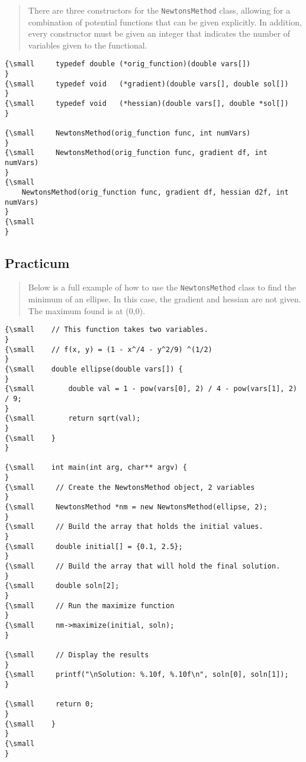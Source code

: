\begin{quotation}
There are three constructors for the \texttt{NewtonsMethod} class, allowing
for a combination of potential functions that can be given explicitly. In
addition, every constructor must be given an integer that indicates the
number of variables given to the functional.{\small }
\end{quotation}

\begin{verbatim}
{\small     typedef double (*orig_function)(double vars[])
}
{\small     typedef void   (*gradient)(double vars[], double sol[])
}
{\small     typedef void   (*hessian)(double vars[], double *sol[])
}
 
{\small     NewtonsMethod(orig_function func, int numVars)
}
{\small     NewtonsMethod(orig_function func, gradient df, int numVars)
}
{\small 
    NewtonsMethod(orig_function func, gradient df, hessian d2f, int numVars)
}
{\small   
}
\end{verbatim}

\subsection*{Practicum}

\begin{quotation}
Below is a full example of how to use the \texttt{NewtonsMethod} class to
find the minimum of an ellipse. In this case, the gradient and hessian are
not given. The maximum found is at (0,0).{\small }
\end{quotation}

\begin{verbatim}
{\small    // This function takes two variables.
}
{\small    // f(x, y) = (1 - x^/4 - y^2/9) ^(1/2)
}
{\small    double ellipse(double vars[]) {
}
{\small        double val = 1 - pow(vars[0], 2) / 4 - pow(vars[1], 2) / 9;
}
{\small        return sqrt(val);
}
{\small    }
}
 
{\small    int main(int arg, char** argv) {
}
{\small     // Create the NewtonsMethod object, 2 variables
}
{\small     NewtonsMethod *nm = new NewtonsMethod(ellipse, 2);
}
{\small     // Build the array that holds the initial values.
}
{\small     double initial[] = {0.1, 2.5};
}
{\small     // Build the array that will hold the final solution.
}
{\small     double soln[2];
}
{\small     // Run the maximize function
}
{\small     nm->maximize(initial, soln);
}
 
{\small     // Display the results
}
{\small     printf("\nSolution: %.10f, %.10f\n", soln[0], soln[1]);
}
 
{\small     return 0;
}
{\small    }
}
{\small   
}
\end{verbatim}


